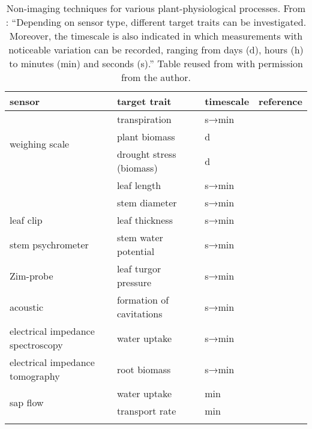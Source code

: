 
\begin{sidewaystable}[hbpt]
    \centering
    \caption[Non-imaging techniques for various plant-physiological processes.]{Non-imaging techniques for various plant-physiological processes. From \citet{pieters_reservoir_2022}: ``Depending on sensor type, different target traits can be investigated. Moreover, the timescale is also indicated in which measurements with noticeable variation can be recorded, ranging from days (d), hours (h) to minutes (min) and seconds (s).'' Table reused from \citet{pieters_reservoir_2022} with permission from the author.}
    \label{table:non-imaging-techniques}
    \begin{tabularx}{0.8\textwidth}{lllX}
        \toprule
        \textbf{sensor} & \textbf{target trait} & \textbf{timescale} & \textbf{reference}  \\
        \midrule
        \multirow{3}{5.2cm}{weighing scale} & transpiration & s→min & \textcite{wallach2010}  \\
                                    & plant biomass & d & \textcite{vanleperen1994} \\
                                    & drought stress (biomass)  & d & \textcite{wallach2010}  \\
        \arrayrulecolor{black!10!white}
        \midrule
        \multirow{2}{5.2cm}{\glsxtrfull{LVDT}} & leaf length & s→min  & \textcite{barillot2020} \\
                                      & stem diameter & s→min & \textcite{deswaef2015a} \\
        \midrule
        leaf clip & leaf thickness       & s→min    & \textcite{deswaef2015}      \\
        \midrule
        stem psychrometer & stem water potential & s→min      & \textcite{vandegehuchte2014} \\
        \midrule
        Zim-probe & leaf turgor pressure & s→min      & \textcite{rodriguez-dominguez2019} \\
        \midrule
        acoustic & formation of cavitations & s→min      & \textcite{debaerdemaeker2019} \\
        \midrule
        electrical impedance spectroscopy & water uptake & s→min & \textcite{ehosioke2020} \\
        electrical impedance tomography & root biomass & s→min & \textcite{ehosioke2020} \\
        \midrule
        \multirow{2}{5.2cm}{sap flow} & water uptake & min & \multirow{2}{5.2cm}{\textcite{hanssens2015}} \\
                        & transport rate & min & \\
        \arrayrulecolor{black}
        \bottomrule
    \end{tabularx}
    
\end{sidewaystable}